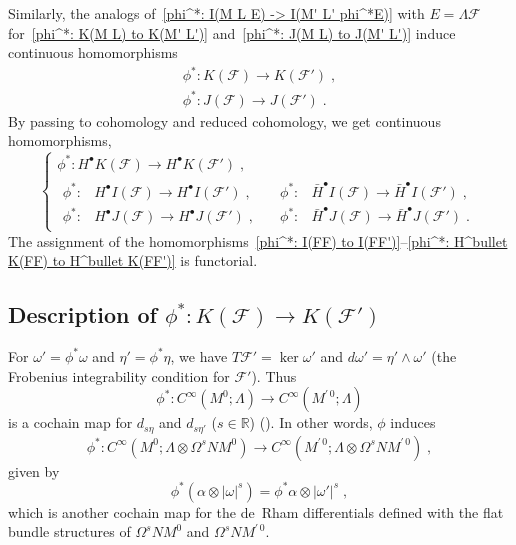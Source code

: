 \documentclass{memo-l}
\theoremstyle{plain}
\theoremstyle{definition}
\theoremstyle{remark}
\newcommand{\R}{\mathbb{R}}
\newcommand{\FF}{\mathcal{F}}
\numberwithin{section}{chapter}
\numberwithin{equation}{section}%
\begin{document}
Similarly, the analogs of~\eqref{phi^*: I(M L E) -> I(M' L' phi^*E)} with $E=\Lambda\FF$ for~\eqref{phi^*: K(M L) to K(M' L')} and~\eqref{phi^*: J(M L) to J(M' L')} induce continuous homomorphisms
\begin{gather}
\phi^*:K(\FF)\to K(\FF')\;,\label{phi^*: K(FF) to K(FF')}\\
\phi^*:J(\FF)\to J(\FF')\;.\label{phi^*: J(FF) to J(FF')}
\end{gather}
By passing to cohomology and reduced cohomology, we get continuous homomorphisms,
\begin{equation}\label{phi^*: H^bullet K(FF) to H^bullet K(FF')}
\left\{
\begin{gathered}
\phi^*:H^\bullet K(\FF)\to H^\bullet K(\FF')\;,\\
\begin{alignedat}{2}
\phi^*:&H^\bullet I(\FF)\to H^\bullet I(\FF')\;,&\quad\phi^*:&\bar H^\bullet I(\FF)\to\bar H^\bullet I(\FF')\;,\\
\phi^*:&H^\bullet J(\FF)\to H^\bullet J(\FF')\;,&\quad\phi^*:&\bar H^\bullet J(\FF)\to\bar H^\bullet J(\FF')\;.
\end{alignedat}
\end{gathered}
\right.
\end{equation}
The assignment of the homomorphisms~\eqref{phi^*: I(FF) to I(FF')}--\eqref{phi^*: H^bullet K(FF) to H^bullet K(FF')} is functorial.



\subsection{Description of $\phi^*:K(\FF)\to K(\FF')$}\label{ss: description of phi^*:K(FF) to K(FF')}

For $\omega'=\phi^*\omega$ and $\eta'=\phi^*\eta$, we have $T\FF'=\ker\omega'$ and $d\omega'=\eta'\wedge\omega'$ (the Frobenius integrability condition for $\FF'$). Thus
\begin{equation}\label{phi^*: C^infty(M^0 Lambda) to C^infty(M^prime 0 Lambda)}
\phi^*:C^\infty(M^0;\Lambda)\to C^\infty(M^{\prime\,0};\Lambda)
\end{equation}
is a cochain map for $d_{s\eta}$ and $d_{s\eta'}$ ($s\in\R$) (). In other words, $\phi$ induces
\begin{equation}
\label{phi^*: C^infty(M^0 Lambda otimes Omega^sNM^0) to C^infty(M^prime 0 Lambda otimes Omega^sNM^prime 0)}
\phi^*:C^\infty(M^0;\Lambda\otimes\Omega^sNM^0)\to C^\infty(M^{\prime\,0};\Lambda\otimes\Omega^sNM^{\prime\,0})\;,
\end{equation} 
given by
\begin{equation}\label{phi^*(alpha otimes |omega|^s) = phi^*alpha otimes |omega'|^s}
\phi^*(\alpha\otimes|\omega|^s)=\phi^*\alpha\otimes|\omega'|^s\;,
\end{equation}
which is another cochain map for the de~Rham differentials defined with the flat bundle structures of $\Omega^sNM^0$ and $\Omega^sNM^{\prime\,0}$.
\end{document}
